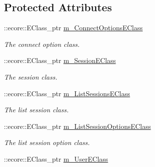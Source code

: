\subsection*{Protected Attributes}
\begin{DoxyCompactItemize}
\item 
\hypertarget{classUMS__Data_1_1UMS__DataPackage_ab1a0e1c3453703506af35cd059816d13}{
::ecore::EClass\_\-ptr \hyperlink{classUMS__Data_1_1UMS__DataPackage_ab1a0e1c3453703506af35cd059816d13}{m\_\-ConnectOptionsEClass}}
\label{classUMS__Data_1_1UMS__DataPackage_ab1a0e1c3453703506af35cd059816d13}

\begin{DoxyCompactList}\small\item\em The connect option class. \item\end{DoxyCompactList}\item 
\hypertarget{classUMS__Data_1_1UMS__DataPackage_a5f8e02a8a96cfc52b1f89ffacaff5539}{
::ecore::EClass\_\-ptr \hyperlink{classUMS__Data_1_1UMS__DataPackage_a5f8e02a8a96cfc52b1f89ffacaff5539}{m\_\-SessionEClass}}
\label{classUMS__Data_1_1UMS__DataPackage_a5f8e02a8a96cfc52b1f89ffacaff5539}

\begin{DoxyCompactList}\small\item\em The session class. \item\end{DoxyCompactList}\item 
\hypertarget{classUMS__Data_1_1UMS__DataPackage_accc1f69b167e9b67f58f29d91640d881}{
::ecore::EClass\_\-ptr \hyperlink{classUMS__Data_1_1UMS__DataPackage_accc1f69b167e9b67f58f29d91640d881}{m\_\-ListSessionsEClass}}
\label{classUMS__Data_1_1UMS__DataPackage_accc1f69b167e9b67f58f29d91640d881}

\begin{DoxyCompactList}\small\item\em The list session class. \item\end{DoxyCompactList}\item 
\hypertarget{classUMS__Data_1_1UMS__DataPackage_ae64107d4f8ca58c05867c8b0f54a47b9}{
::ecore::EClass\_\-ptr \hyperlink{classUMS__Data_1_1UMS__DataPackage_ae64107d4f8ca58c05867c8b0f54a47b9}{m\_\-ListSessionOptionsEClass}}
\label{classUMS__Data_1_1UMS__DataPackage_ae64107d4f8ca58c05867c8b0f54a47b9}

\begin{DoxyCompactList}\small\item\em The list session option class. \item\end{DoxyCompactList}\item 
\hypertarget{classUMS__Data_1_1UMS__DataPackage_a066a73d47fb098cac7f1aef6ed405172}{
::ecore::EClass\_\-ptr \hyperlink{classUMS__Data_1_1UMS__DataPackage_a066a73d47fb098cac7f1aef6ed405172}{m\_\-UserEClass}}
\label{classUMS__Data_1_1UMS__DataPackage_a066a73d47fb098cac7f1aef6ed405172}


\end{DoxyCompactItemize}
